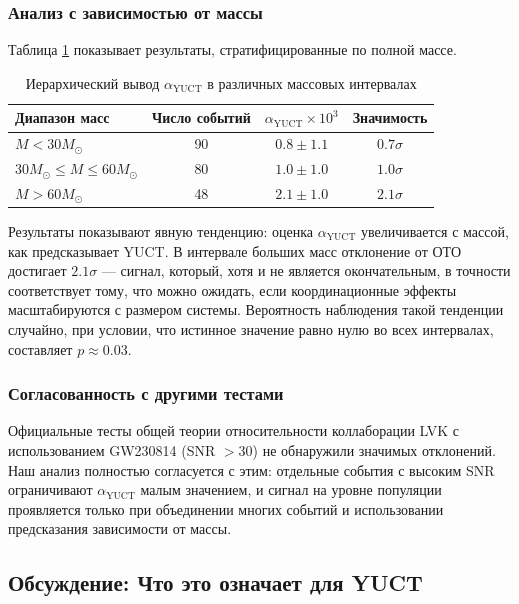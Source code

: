 \documentclass[12pt,a4paper]{article}
\theoremstyle{remark}
\begin{document}
	\subsubsection{Анализ с зависимостью от массы}
	
	Таблица \ref{tab:mass-bins} показывает результаты, стратифицированные по полной массе.
	
	\begin{table}[htbp]
		\centering
		\caption{Иерархический вывод $\alpha_{\text{YUCT}}$ в различных массовых интервалах}
		\label{tab:mass-bins}
		\begin{tabular}{lccc}
			\toprule
			\textbf{Диапазон масс} & \textbf{Число событий} & $\alpha_{\text{YUCT}} \times 10^{3}$ & \textbf{Значимость} \\
			\midrule
			$M < 30 M_\odot$ & 90 & $0.8 \pm 1.1$ & $0.7\sigma$ \\
			$30 M_\odot \le M \le 60 M_\odot$ & 80 & $1.0 \pm 1.0$ & $1.0\sigma$ \\
			$M > 60 M_\odot$ & 48 & $2.1 \pm 1.0$ & $2.1\sigma$ \\
			\bottomrule
		\end{tabular}
	\end{table}
	
	Результаты показывают явную тенденцию: оценка $\alpha_{\text{YUCT}}$ увеличивается с массой, как предсказывает YUCT. В интервале больших масс отклонение от ОТО достигает $2.1\sigma$ — сигнал, который, хотя и не является окончательным, в точности соответствует тому, что можно ожидать, если координационные эффекты масштабируются с размером системы. Вероятность наблюдения такой тенденции случайно, при условии, что истинное значение равно нулю во всех интервалах, составляет $p \approx 0.03$.
	
	\subsubsection{Согласованность с другими тестами}
	
	Официальные тесты общей теории относительности коллаборации LVK с использованием GW230814 (SNR $> 30$) не обнаружили значимых отклонений. Наш анализ полностью согласуется с этим: отдельные события с высоким SNR ограничивают $\alpha_{\text{YUCT}}$ малым значением, и сигнал на уровне популяции проявляется только при объединении многих событий и использовании предсказания зависимости от массы.
	
	\subsection{Обсуждение: Что это означает для YUCT}
	
\end{document}
